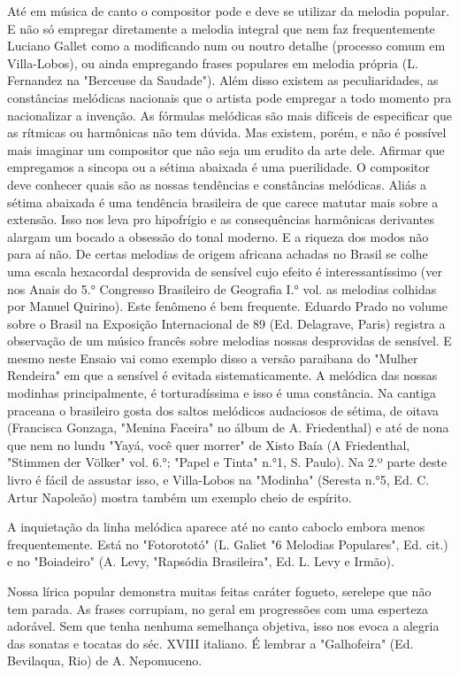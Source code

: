 Até em música de canto o compositor pode e deve se utilizar da melodia
popular. E não só empregar diretamente a melodia integral que nem faz
frequentemente Luciano Gallet como a modificando num ou noutro detalhe
(processo comum em Villa-Lobos), ou ainda empregando frases populares em
melodia própria (L. Fernandez na "Berceuse da Saudade"). Além disso
existem as peculiaridades, as constâncias melódicas nacionais que o
artista pode empregar a todo momento pra nacionalizar a invenção. As
fórmulas melódicas são mais difíceis de especificar que as rítmicas ou
harmônicas não tem dúvida. Mas existem, porém, e não é possível mais
imaginar um compositor que não seja um erudito da arte dele. Afirmar que
empregamos a sincopa ou a sétima abaixada é uma puerilidade. O
compositor deve conhecer quais são as nossas tendências e constâncias
melódicas. Aliás a sétima abaixada é uma tendência brasileira de que
carece matutar mais sobre a extensão. Isso nos leva pro hipofrígio e as
consequências harmônicas derivantes alargam um bocado a obsessão do
tonal moderno. E a riqueza dos modos não para aí não. De certas melodias
de origem africana achadas no Brasil se colhe uma escala hexacordal
desprovida de sensível cujo efeito é interessantíssimo (ver nos Anais do
5.° Congresso Brasileiro de Geografia I.° vol. as melodias colhidas por
Manuel Quirino). Este fenômeno é bem frequente. Eduardo Prado no volume
sobre o Brasil na Exposição Internacional de 89 (Ed. Delagrave, Paris)
registra a observação de um músico francês sobre melodias nossas
desprovidas de sensível. E mesmo neste Ensaio vai como exemplo disso a
versão paraibana do "Mulher Rendeira" em que a sensível é evitada
sistematicamente. A melódica das nossas modinhas principalmente, é
torturadíssima e isso é uma constância. Na cantiga praceana o brasileiro
gosta dos saltos melódicos audaciosos de sétima, de oitava (Francisca
Gonzaga, "Menina Faceira" no álbum de A. Friedenthal) e até de nona que
nem no lundu "Yayá, você quer morrer" de Xisto Baía (A Friedenthal,
"Stimmen der Völker" vol. 6.°; "Papel e Tinta" n.°1, S. Paulo). Na 2.º
parte deste livro é fácil de assustar isso, e Villa-Lobos na "Modinha"
(Seresta n.°5, Ed. C. Artur Napoleão) mostra também um exemplo cheio de
espírito.~

A inquietação da linha melódica aparece até no canto caboclo embora
menos frequentemente. Está no "Fotorototó" (L. Galiet "6 Melodias
Populares", Ed. cit.) e no "Boiadeiro" (A. Levy, "Rapsódia Brasileira",
Ed. L. Levy e Irmão).~

Nossa lírica popular demonstra muitas feitas caráter fogueto, serelepe
que não tem parada. As frases corrupiam, no geral em progressões com uma
esperteza adorável. Sem que tenha nenhuma semelhança objetiva, isso nos
evoca a alegria das sonatas e tocatas do séc. XVIII italiano. É lembrar
a "Galhofeira" (Ed. Bevilaqua, Rio) de A. Nepomuceno.

